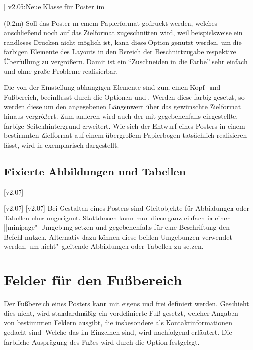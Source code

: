 \begin{DeclareEntity}{}[%
  v2.05:Neue Klasse für Poster im \TUDCD%
]
\begin{Declaration}
  {}
  (0.2in)
Soll das Poster in einem Papierformat gedruckt werden, welches anschließend 
noch auf das Zielformat zugeschnitten wird, weil beispielsweise ein randloses 
Drucken nicht möglich ist, kann diese Option genutzt werden, um die farbigen 
Elemente des Layouts in den Bereich der Beschnittzugabe respektive Überfüllung 
zu vergrößern. Damit ist ein \enquote{Zuschneiden in die Farbe} sehr einfach 
und ohne große Probleme realisierbar.

Die von der Einstellung  abhängigen 
Elemente sind zum einen Kopf- und Fußbereich, beeinflusst durch die Optionen 
 und . Werden diese farbig gesetzt, so werden 
diese um den angegebenen Längenwert über das gewünschte Zielformat hinaus 
vergrößert. Zum anderen wird auch der mit  gegebenenfalls 
eingestellte, farbige Seitenhintergrund erweitert. Wie sich der Entwurf eines 
Posters in einem bestimmten Zielformat auf einem übergroßem Papierbogen 
tatsächlich realisieren lässt, wird in  exemplarisch 
dargestellt.
\end{Declaration}



\subsection{Fixierte Abbildungen und Tabellen}
%
\begin{Declaration}
  {}
  [v2.07]
\begin{Declaration}
  {}
  [v2.07]
%
[v2.07]
Bei Gestalten eines Posters sind Gleitobjekte für Abbildungen oder Tabellen 
eher ungeeignet. Stattdessen kann man diese ganz einfach in einer 
\Environment||{minipage}"~Umgebung setzen und gegebenenfalls für eine 
Beschriftung den Befehl 
nutzen. Alternativ dazu können diese beiden Umgebungen verwendet werden, um 
nicht"~gleitende Abbildungen oder Tabellen zu setzen.
\end{Declaration}
\end{Declaration}



\section{%
  Felder für den Fußbereich%
  \label{sec:poster:foot}%
}
%
Der Fußbereich eines Posters kann mit  eigens und frei 
definiert werden. Geschieht dies nicht, wird standardmäßig ein vordefinierte 
Fuß gesetzt, welcher Angaben von bestimmten Feldern ausgibt, die insbesondere 
als Kontaktinformationen gedacht sind. Welche das im Einzelnen sind, wird 
nachfolgend erläutert. Die farbliche Ausprägung des Fußes wird durch die Option
 festgelegt.


\end{DeclareEntity}
